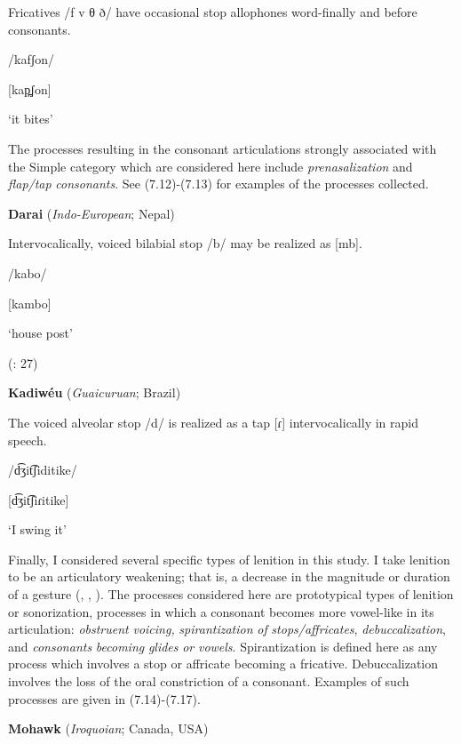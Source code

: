 Fricatives /f v θ ð/ have occasional stop allophones word-finally and before consonants.

/kafʃon/

[kap̪ʃon]

‘it bites’

\citep[16]{Newmark1957}

\z

  The processes resulting in the consonant articulations strongly associated with the Simple category which are considered here include \textit{prenasalization} and \textit{flap/tap} \textit{consonants}. See (7.12)-(7.13) for examples of the processes collected.

\ea\label{ex:(7.12)}
  \textbf{Darai} (\textit{Indo-European}; Nepal)

Intervocalically, voiced bilabial stop /b/ may be realized as [mb].

/kabo/

[kambo]

‘house post’

(\citealt{KotapishKotapish1973}: 27)
\z

\ea\label{ex:(7.13)}
  \textbf{Kadiwéu} (\textit{Guaicuruan}; Brazil)

The voiced alveolar stop /d/ is realized as a tap [ɾ] intervocalically in rapid speech.

/d͡ʒit͡ʃiditike/

[d͡ʒit͡ʃiɾitike]

‘I swing it’

\citep[16]{Sandalo1997}

\z

  Finally, I considered several specific types of lenition in this study. I take lenition to be an articulatory weakening; that is, a decrease in the magnitude or duration of a gesture (\citealt{BrowmanGoldstein1992b}, \citealt{MowreyPagliuca1995}, \citealt{BybeeEasterday2019}). The processes considered here are prototypical types of lenition or sonorization, processes in which a consonant becomes more vowel-like in its articulation: \textit{obstruent} \textit{voicing,} \textit{spirantization} \textit{of} \textit{stops/affricates}, \textit{debuccalization}, and \textit{consonants} \textit{becoming} \textit{glides} \textit{or} \textit{vowels}. Spirantization is defined here as any process which involves a stop or affricate becoming a fricative. Debuccalization involves the loss of the oral constriction of a consonant. Examples of such processes are given in (7.14)-(7.17).

\ea\label{ex:(7.14)}
  \textbf{Mohawk} (\textit{Iroquoian}; Canada, USA)


